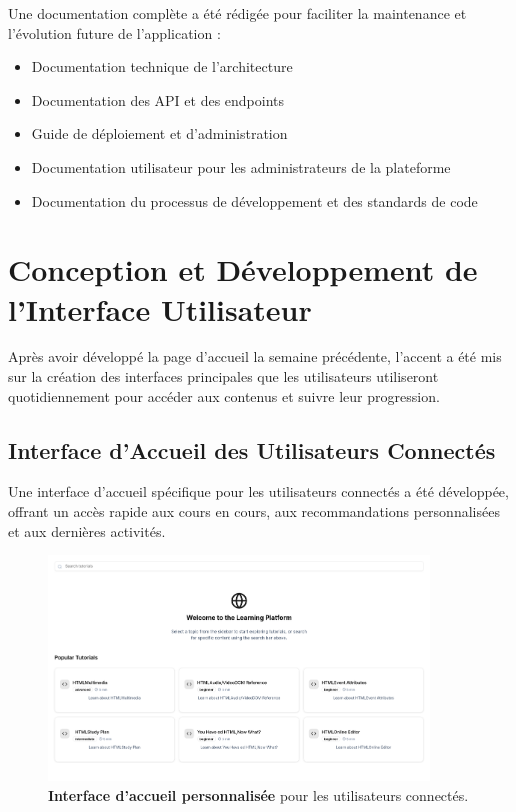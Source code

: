 Une documentation complète a été rédigée pour faciliter la maintenance et l'évolution future de l'application :

\begin{itemize}
  \item Documentation technique de l'architecture
  \item Documentation des API et des endpoints
  \item Guide de déploiement et d'administration
  \item Documentation utilisateur pour les administrateurs de la plateforme
  \item Documentation du processus de développement et des standards de code
\end{itemize}

\section{Conception et Développement de l'Interface Utilisateur}

Après avoir développé la page d'accueil la semaine précédente, l'accent a été mis sur la création des interfaces principales que les utilisateurs utiliseront quotidiennement pour accéder aux contenus et suivre leur progression.

\subsection{Interface d'Accueil des Utilisateurs Connectés}

Une interface d'accueil spécifique pour les utilisateurs connectés a été développée, offrant un accès rapide aux cours en cours, aux recommandations personnalisées et aux dernières activités.

\begin{figure}[h!]
  \centering
  \includegraphics[width=0.9\textwidth,keepaspectratio]{week_3_img/accueil.png}
  \caption{\textbf{Interface d'accueil personnalisée} pour les utilisateurs connectés.}
  \label{fig:user_dashboard}
\end{figure}

